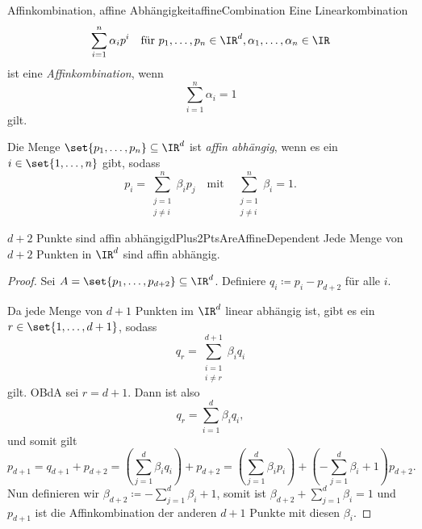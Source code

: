 \documentclass[language=ngerman,algolist,acrolist]{TemplateLecture}
\begin{document}
\begin{defi}{Affinkombination, affine Abhängigkeit}{affineCombination}
    Eine Linearkombination 
    \begin{equation*}
        \sum_{i = 1}^n \alpha_i p^i \quad \text{für $p_1, \ldots, p_n \in \IR^d, \alpha_1, \dots, \alpha_n \in \IR$}
    \end{equation*}
    ist eine \emph{Affinkombination}, wenn 
    \begin{equation*}
        \sum_{i = 1}^n \alpha_i = 1
    \end{equation*}
    gilt.

    Die Menge $\set{p_1, \ldots, p_n} \subseteq \IR^d$ ist \emph{affin abhängig}, wenn es ein $i \in \set{1,\ldots,n}$ gibt, sodass 
    \begin{equation*}
        p_i = \sum_{\substack{j = 1 \\ j \neq i}}^n \beta_i p_j \quad \text{mit} \quad \sum_{\substack{j = 1 \\ j \neq i}}^n \beta_i = 1.
    \end{equation*}
\end{defi}

\begin{lem}{$d+2$ Punkte sind affin abhängig}{dPlus2PtsAreAffineDependent}
    Jede Menge von $d + 2$ Punkten in $\IR^d$ sind affin abhängig.
\end{lem}

\begin{proof}
    Sei $A = \set{p_1, \ldots, p_{d + 2}} \subseteq \IR^d$. Definiere $q_i \coloneqq p_i - p_{d + 2}$ für alle $i$.

    Da jede Menge von $d + 1$ Punkten im $\IR^d$ linear abhängig ist, gibt es ein $r \in \set{1, \ldots, d + 1}$, sodass
    \begin{equation*}
        q_r = \sum_{\substack{i = 1 \\ i \neq r}}^{d + 1} \beta_i q_i
    \end{equation*}
    gilt. OBdA sei $r = d + 1$. Dann ist also 
    \begin{equation*}
        q_r = \sum_{i = 1}^d \beta_i q_i,
    \end{equation*}
    und somit gilt 
    \begin{equation*}
        p_{d + 1} = q_{d + 1} + p_{d + 2} = \left( \sum_{j = 1}^d \beta_i q_i \right) + p_{d + 2} = \left( \sum_{j = 1}^d \beta_i p_i \right) + \left( - \sum_{j = 1}^d \beta_i  + 1\right) p_{d + 2}.
    \end{equation*}
    Nun definieren wir $\beta_{d + 2} \coloneqq - \sum_{j = 1}^d \beta_i + 1$, somit ist $\beta_{d + 2} + \sum_{j = 1}^d \beta_i = 1$ und $p_{d + 1}$ ist die Affinkombination der anderen $d + 1$ Punkte mit diesen $\beta_i$.
\end{proof}
\end{document}
